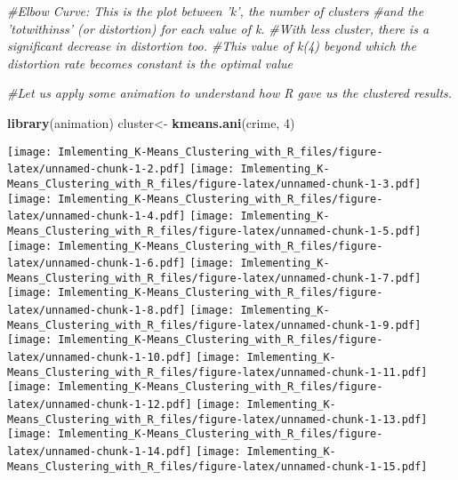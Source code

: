 \documentclass[]{article}
\newenvironment{Shaded}{\begin{snugshade}}{\end{snugshade}}
\newcommand{\KeywordTok}[1]{\textcolor[rgb]{0.13,0.29,0.53}{\textbf{#1}}}
\newcommand{\DecValTok}[1]{\textcolor[rgb]{0.00,0.00,0.81}{#1}}
\newcommand{\StringTok}[1]{\textcolor[rgb]{0.31,0.60,0.02}{#1}}
\newcommand{\CommentTok}[1]{\textcolor[rgb]{0.56,0.35,0.01}{\textit{#1}}}
\newcommand{\OperatorTok}[1]{\textcolor[rgb]{0.81,0.36,0.00}{\textbf{#1}}}
\newcommand{\NormalTok}[1]{#1}
\begin{document}
\begin{Shaded}
\begin{Highlighting}[]
\CommentTok{#Elbow Curve: This is the plot between 'k', the number of clusters }
\CommentTok{#and the 'totwithinss' (or distortion) for each value of k. }
\CommentTok{#With less cluster, there is a significant decrease in distortion too. }
\CommentTok{#This value of k(4) beyond which the distortion rate becomes constant is the optimal value}

\CommentTok{#Let us apply some animation to understand how R gave us the clustered results.}

\KeywordTok{library}\NormalTok{(animation)}
\NormalTok{cluster<-}\StringTok{ }\KeywordTok{kmeans.ani}\NormalTok{(crime, }\DecValTok{4}\NormalTok{)}
\end{Highlighting}
\end{Shaded}

\texttt{[image: Imlementing\_K-Means\_Clustering\_with\_R\_files/figure-latex/unnamed-chunk-1-2.pdf]}
\texttt{[image: Imlementing\_K-Means\_Clustering\_with\_R\_files/figure-latex/unnamed-chunk-1-3.pdf]}
\texttt{[image: Imlementing\_K-Means\_Clustering\_with\_R\_files/figure-latex/unnamed-chunk-1-4.pdf]}
\texttt{[image: Imlementing\_K-Means\_Clustering\_with\_R\_files/figure-latex/unnamed-chunk-1-5.pdf]}
\texttt{[image: Imlementing\_K-Means\_Clustering\_with\_R\_files/figure-latex/unnamed-chunk-1-6.pdf]}
\texttt{[image: Imlementing\_K-Means\_Clustering\_with\_R\_files/figure-latex/unnamed-chunk-1-7.pdf]}
\texttt{[image: Imlementing\_K-Means\_Clustering\_with\_R\_files/figure-latex/unnamed-chunk-1-8.pdf]}
\texttt{[image: Imlementing\_K-Means\_Clustering\_with\_R\_files/figure-latex/unnamed-chunk-1-9.pdf]}
\texttt{[image: Imlementing\_K-Means\_Clustering\_with\_R\_files/figure-latex/unnamed-chunk-1-10.pdf]}
\texttt{[image: Imlementing\_K-Means\_Clustering\_with\_R\_files/figure-latex/unnamed-chunk-1-11.pdf]}
\texttt{[image: Imlementing\_K-Means\_Clustering\_with\_R\_files/figure-latex/unnamed-chunk-1-12.pdf]}
\texttt{[image: Imlementing\_K-Means\_Clustering\_with\_R\_files/figure-latex/unnamed-chunk-1-13.pdf]}
\texttt{[image: Imlementing\_K-Means\_Clustering\_with\_R\_files/figure-latex/unnamed-chunk-1-14.pdf]}
\texttt{[image: Imlementing\_K-Means\_Clustering\_with\_R\_files/figure-latex/unnamed-chunk-1-15.pdf]}

\begin{Shaded}
\end{Shaded}
\end{document}
